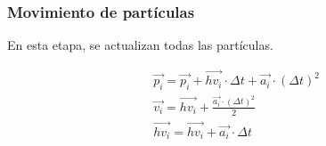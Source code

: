 \subsubsection{Movimiento de partículas}

En esta etapa, se actualizan todas las partículas.

\[
\begin{split}
&\vec{p_i} = \vec{p_i} + \overrightarrow{hv_i} \cdot \Delta t + \vec{a_i} \cdot (\Delta t)^2\\
&\vec{v_i} = \overrightarrow{hv_i} + \frac{\vec{a_i} \cdot (\Delta t)^2}{2}\\
&\overrightarrow{hv_i} = \overrightarrow{hv_i} + \vec{a_i} \cdot \Delta t
\end{split}
\]
